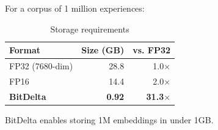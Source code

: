 For a corpus of 1 million experiences:

\begin{table}[h]
\centering
\caption{Storage requirements}
\label{tab:storage}
\begin{tabular}{lrr}
\toprule
\textbf{Format} & \textbf{Size (GB)} & \textbf{vs. FP32} \\
\midrule
FP32 (7680-dim) & 28.8 & 1.0$\times$ \\
FP16 & 14.4 & 2.0$\times$ \\
\textbf{BitDelta} & \textbf{0.92} & \textbf{31.3$\times$} \\
\bottomrule
\end{tabular}
\end{table}

BitDelta enables storing 1M embeddings in under 1GB.

